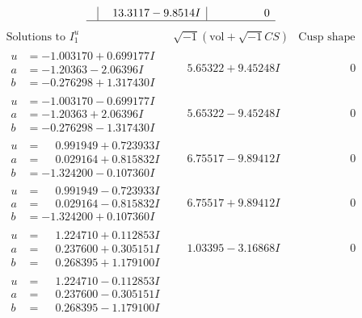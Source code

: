 \documentclass[1p]{elsarticle_modified}
\theoremstyle{definition}
\newcommand{\I}{\sqrt{-1}}
\begin{document}
$$\begin{array}{c|c|c}
 & \phantom{-}13.3117 - 9.8514 I & \phantom{-0.000000 } 0\\
 \hline 
 \end{array}$$\newpage$$\begin{array}{c|c|c}  
\text{Solutions to }I^u_{1}& \I (\text{vol} + \sqrt{-1}CS) & \text{Cusp shape}\\
 \hline 
\begin{aligned}
u &= -1.003170 + 0.699177 I \\
a &= -1.20363 - 2.06396 I \\
b &= -0.276298 + 1.317430 I\end{aligned}
 & \phantom{-}5.65322 + 9.45248 I & \phantom{-0.000000 } 0 \\ \hline\begin{aligned}
u &= -1.003170 - 0.699177 I \\
a &= -1.20363 + 2.06396 I \\
b &= -0.276298 - 1.317430 I\end{aligned}
 & \phantom{-}5.65322 - 9.45248 I & \phantom{-0.000000 } 0 \\ \hline\begin{aligned}
u &= \phantom{-}0.991949 + 0.723933 I \\
a &= \phantom{-}0.029164 + 0.815832 I \\
b &= -1.324200 - 0.107360 I\end{aligned}
 & \phantom{-}6.75517 - 9.89412 I & \phantom{-0.000000 } 0 \\ \hline\begin{aligned}
u &= \phantom{-}0.991949 - 0.723933 I \\
a &= \phantom{-}0.029164 - 0.815832 I \\
b &= -1.324200 + 0.107360 I\end{aligned}
 & \phantom{-}6.75517 + 9.89412 I & \phantom{-0.000000 } 0 \\ \hline\begin{aligned}
u &= \phantom{-}1.224710 + 0.112853 I \\
a &= \phantom{-}0.237600 + 0.305151 I \\
b &= \phantom{-}0.268395 + 1.179100 I\end{aligned}
 & \phantom{-}1.03395 - 3.16868 I & \phantom{-0.000000 } 0 \\ \hline\begin{aligned}
u &= \phantom{-}1.224710 - 0.112853 I \\
a &= \phantom{-}0.237600 - 0.305151 I \\
b &= \phantom{-}0.268395 - 1.179100 I\end{aligned}

\end{array}$$
\end{document}
